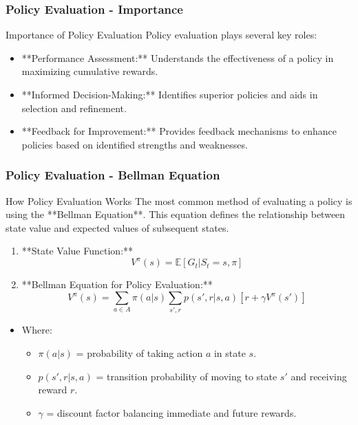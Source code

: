 \documentclass[aspectratio=169]{beamer}
\begin{document}
\begin{frame}[fragile]
    \frametitle{Policy Evaluation - Importance}
    \begin{block}{Importance of Policy Evaluation}
        Policy evaluation plays several key roles:
    \end{block}
    
    \begin{itemize}
        \item **Performance Assessment:** Understands the effectiveness of a policy in maximizing cumulative rewards.
        \item **Informed Decision-Making:** Identifies superior policies and aids in selection and refinement.
        \item **Feedback for Improvement:** Provides feedback mechanisms to enhance policies based on identified strengths and weaknesses.
    \end{itemize}
\end{frame}

\begin{frame}[fragile]
    \frametitle{Policy Evaluation - Bellman Equation}
    \begin{block}{How Policy Evaluation Works}
        The most common method of evaluating a policy is using the **Bellman Equation**. This equation defines the relationship between state value and expected values of subsequent states.
    \end{block}

    \begin{enumerate}
        \item **State Value Function:**
        \begin{equation}
            V^\pi(s) = \mathbb{E} \left[ G_t | S_t = s, \pi \right]
        \end{equation}
        
        \item **Bellman Equation for Policy Evaluation:**
        \begin{equation}
            V^\pi(s) = \sum_{a \in A} \pi(a|s) \sum_{s', r} p(s', r | s, a) \left[ r + \gamma V^\pi(s') \right]
        \end{equation}
    \end{enumerate}
    
    \begin{itemize}
        \item Where:
        \begin{itemize}
            \item $\pi(a|s)$ = probability of taking action $a$ in state $s$.
            \item $p(s', r | s, a)$ = transition probability of moving to state $s'$ and receiving reward $r$.
            \item $\gamma$ = discount factor balancing immediate and future rewards.
        \end{itemize}
    \end{itemize}
\end{frame}
\end{document}
